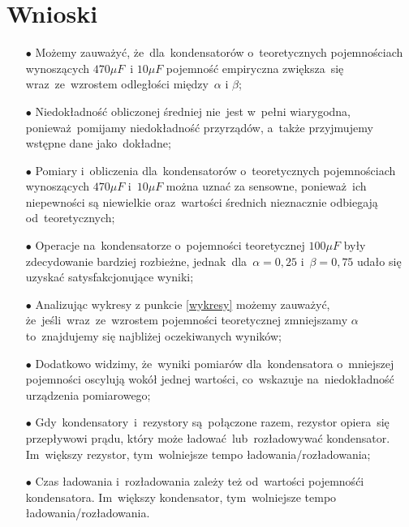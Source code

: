\documentclass[12pt]{mwart}
\begin{document}
	\section{Wnioski}
	\begin{itemize}
		\item[$\bullet$] Możemy zauważyć, że~dla~kondensatorów o~teoretycznych pojemnościach wynoszących $470\mu F$~i $10\mu F$ pojemność empiryczna zwiększa~się wraz~ze~wzrostem odległości między~$\alpha$ i $\beta$;
		\item[$\bullet$] Niedokładność obliczonej średniej nie~jest w~pełni wiarygodna, ponieważ~pomijamy niedokładność przyrządów, a~także przyjmujemy wstępne dane jako~dokładne;
		\item[$\bullet$] Pomiary i~obliczenia dla~kondensatorów o~teoretycznych pojemnościach wynoszących $470\mu F$ i~$10\mu F$ można uznać za sensowne, ponieważ~ich niepewności są niewielkie oraz~wartości średnich nieznacznie odbiegają od~teoretycznych;
		\item[$\bullet$] Operacje na~kondensatorze o~pojemności teoretycznej $100\mu F$ były zdecydowanie bardziej rozbieżne, jednak~dla~$\alpha=0,25$ i~$\beta=0,75$ udało się uzyskać satysfakcjonujące wyniki;
		\item[$\bullet$] Analizując wykresy z punkcie \eqref{wykresy} możemy zauważyć, że~jeśli~wraz~ze~wzrostem pojemności teoretycznej zmniejszamy $\alpha$ to~znajdujemy się najbliżej oczekiwanych wyników;
		\item[$\bullet$] Dodatkowo widzimy, że~wyniki pomiarów dla~kondensatora o~mniejszej pojemności oscylują wokół jednej wartości, co~wskazuje na~niedokładność urządzenia pomiarowego;
		\item[$\bullet$] Gdy~kondensatory~i~rezystory są~połączone razem, rezystor opiera~się przepływowi prądu, który może ładować~lub~rozładowywać kondensator. Im~większy rezystor, tym~wolniejsze tempo ładowania/rozładowania;
		\item[$\bullet$] Czas ładowania i~rozładowania zależy też od~wartości pojemnośći kondensatora. Im~większy kondensator, tym~wolniejsze tempo ładowania/rozładowania.
	\end{itemize}
\end{document}
